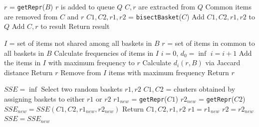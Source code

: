 \begin{algorithm}
\caption{TX-Means pseudocode.}
\begin{algorithmic}[1]
    \State $r$ = \texttt{getRepr}($B$)  \quad  {}
    \State $r$ is added to queue $Q$
     
        \State $C, r$ are extracted from $Q$
        \State Common items are removed from $C$ and $r$ 
        \State $C1,C2,r1,r2$ = \texttt{bisectBasket}($C$)
          
            \State Add $C1,C2,r1,r2$ to $Q$ 
        \Else
            \State Add $C, r$ to result 
        \EndIf
    \EndWhile
    \State Return result
\end{algorithmic}
\end{algorithm} 

\begin{algorithm}
\caption{\texttt{getRepr} pseudocode.}
\begin{algorithmic}[1]
    \State $I$ = set of items not shared among all baskets in $B$ 
    \State $r$ = set of items in common to all baskets in $B$ 
    \State Calculate frequencies of items in $I$ 
    \State $i = 0$, $d_0 = \inf$ 
     
        \State $i = i + 1$ 
        \State Add the items in $I$ with maximum frequency to $r$
        \State Calculate $d_i(r,B)$ via Jaccard distance 
         
            \State Return $r$ 
        \Else
            \State Remove from $I$ items with maximum frequency
        \EndIf
    \EndWhile 
    \State Return $r$ 
\end{algorithmic}
\end{algorithm}

\begin{algorithm}
\caption{\texttt{bisectBasket} pseudocode.}
\begin{algorithmic}[1]
    \State $SSE = \inf$
    \State Select two random baskets $r1,r2$
        \State $C1,C2$ = clusters obtained by assigning baskets to either $r1$ or $r2$
        \State $r1_{new}$ = \texttt{getRepr}($C1$)
        \State $r2_{new}$ = \texttt{getRepr}($C2$)
        \State $SSE_{new} = SSE(C1,C2,r1_{new},r2_{new})$
            \State Return $C1,C2,r1,r2$ \quad {}
        \EndIf
        \State $r1 = r1_{new}$
        \State $r2 = r2_{new}$
        \State $SSE = SSE_{new}$
    \EndWhile
\end{algorithmic}
\end{algorithm}

